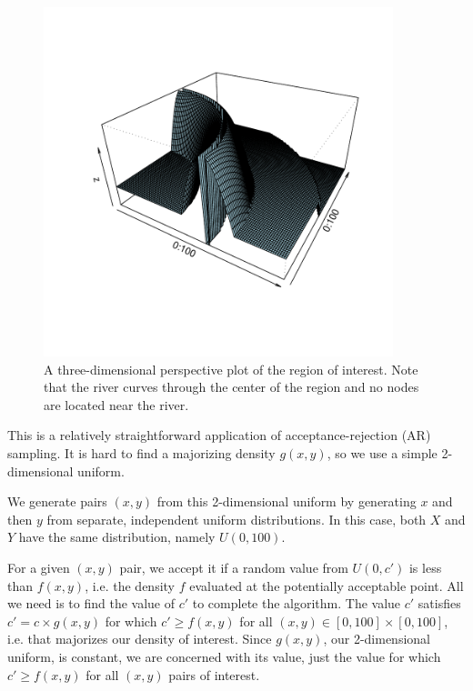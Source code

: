 \begin{figure}[htbp]
\begin{center}
\leavevmode
 \includegraphics[width=4in]{RNG/images/perspRiver} %
\caption{A three-dimensional perspective plot of the region of interest.
Note that the river curves through the center of the region and no nodes
are located near the river.}
\label{perspPlot}
\end{center}
\end{figure}



This is a relatively straightforward application of
acceptance-rejection (AR) sampling.  It is hard to find a majorizing
density $g(x, y)$, so we use a simple 2-dimensional uniform.

We generate pairs $(x, y)$ from this 2-dimensional uniform by
generating $x$ and then $y$ from separate, independent uniform
distributions. In this case, both $X$ and $Y$ have the same
distribution, namely $U(0, 100)$.

For a given $(x, y)$ pair, we accept it if a random value from $U(0,
c')$ is less than $f(x, y)$, i.e. the density $f$ evaluated at the
potentially acceptable point.  All we need is to find the value of
$c'$ to complete the algorithm.  The value $c'$ satisfies $c' =
c\times g(x, y)$ for which $c' \ge f(x, y)$ for all $(x, y) \in
[0,100] \times [0, 100]$, i.e. that majorizes our density of interest.
Since $g(x, y)$, our 2-dimensional uniform, is constant, we are
concerned with its value, just the value for which $c' \ge f(x, y)$
for all $(x, y)$ pairs of interest.

